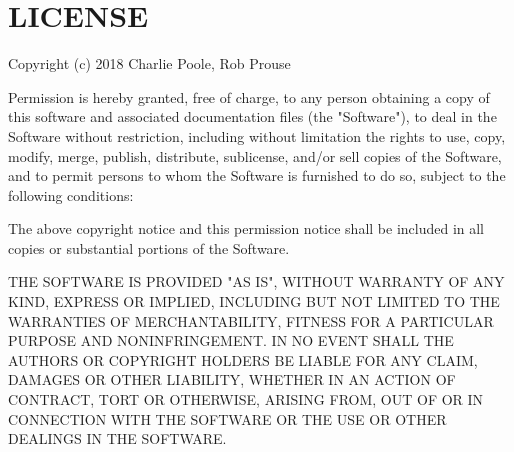 \chapter{LICENSE}
\hypertarget{md__library_2_package_cache_2com_8unity_8ext_8nunit_0d1_80_86_2_l_i_c_e_n_s_e}{}\label{md__library_2_package_cache_2com_8unity_8ext_8nunit_0d1_80_86_2_l_i_c_e_n_s_e}
Copyright (c) 2018 Charlie Poole, Rob Prouse

Permission is hereby granted, free of charge, to any person obtaining a copy of this software and associated documentation files (the "{}\+Software"{}), to deal in the Software without restriction, including without limitation the rights to use, copy, modify, merge, publish, distribute, sublicense, and/or sell copies of the Software, and to permit persons to whom the Software is furnished to do so, subject to the following conditions\+:

The above copyright notice and this permission notice shall be included in all copies or substantial portions of the Software.

THE SOFTWARE IS PROVIDED "{}\+AS IS"{}, WITHOUT WARRANTY OF ANY KIND, EXPRESS OR IMPLIED, INCLUDING BUT NOT LIMITED TO THE WARRANTIES OF MERCHANTABILITY, FITNESS FOR A PARTICULAR PURPOSE AND NONINFRINGEMENT. IN NO EVENT SHALL THE AUTHORS OR COPYRIGHT HOLDERS BE LIABLE FOR ANY CLAIM, DAMAGES OR OTHER LIABILITY, WHETHER IN AN ACTION OF CONTRACT, TORT OR OTHERWISE, ARISING FROM, OUT OF OR IN CONNECTION WITH THE SOFTWARE OR THE USE OR OTHER DEALINGS IN THE SOFTWARE. 